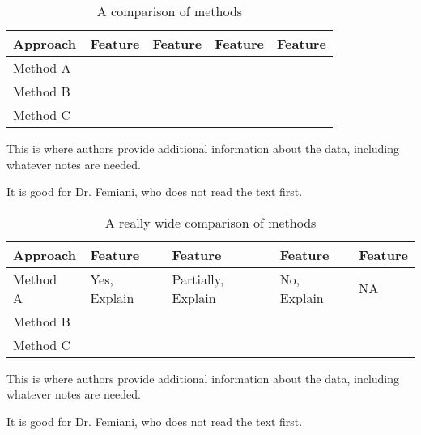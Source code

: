 \begin{table}[htbp]
    \centering
 \begin{threeparttable}
    \caption[Short Title for List of Table]{A comparison of methods}
    \label{tab:work-compared}
    \begin{tabular}{lllll}
        Approach                          & Feature & Feature & Feature & Feature \\ \hline
        Method A~\cite{sample2019}&         &         &         &         \\
        Method B~\cite{sample2019}&         &         &         &         \\
        Method C~\cite{sample2019} &         &         &         &         \\ \hline
    \end{tabular}
    \begin{tablenotes}
        \small
        \item This is where authors provide additional information about
        the data, including whatever notes are needed.
        \item It is good for Dr. Femiani, who does not read the text first.
    \end{tablenotes}
\end{threeparttable}
\end{table}


\begin{landscape}
\begin{table}[]
    \centering
    \begin{threeparttable}
        \caption[Short Title for List of Table]{A really wide comparison of methods}
        \label{tab:big-work-compared}
        \begin{tabular}{lllll}
            Approach                   & Feature & Feature & Feature & Feature \\ \hline
            Method A~\cite{sample2019}
            & %
            {\small Yes, Explain}
            &%
            {\small Partially, Explain }
            &%
            {\small No, Explain}
            &%
            {\small NA} \\
            Method B~\cite{sample2019} &         &         &         &         \\
            Method C~\cite{sample2019} &         &         &         &         \\ \hline
        \end{tabular}
        \begin{tablenotes}
            \small
            \item This is where authors provide additional information about
            the data, including whatever notes are needed.
            \item It is good for Dr. Femiani, who does not read the text first.
        \end{tablenotes}
    \end{threeparttable}
\end{table}
\end{landscape}




